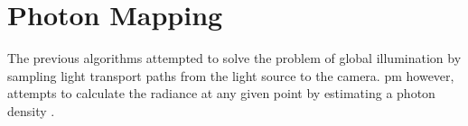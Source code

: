 


\section{Photon Mapping}

The previous algorithms attempted to solve the problem of global illumination by sampling light transport paths from the light source to the camera. \gls{pm} however, attempts to calculate the radiance at any given point by estimating a photon density \citep{Jensen}.

